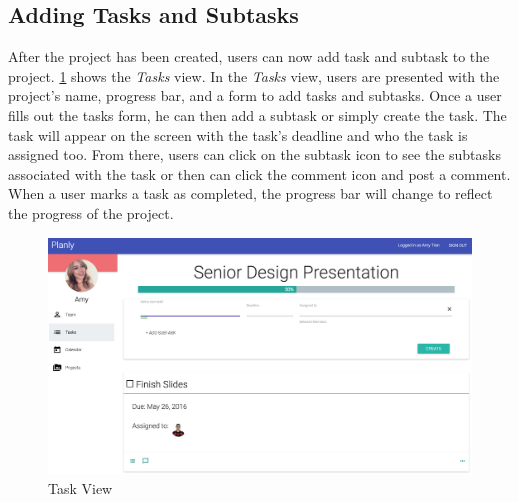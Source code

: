 \subsection{Adding Tasks and Subtasks}
After the project has been created, users can now add task and subtask to the project. \ref{taskview} shows the \emph{Tasks} view. In the \emph{Tasks} view, users are presented with the project's name, progress bar, and a form to add tasks and subtasks. Once a user fills out the tasks form, he can then add a subtask or simply create the task. The task will appear on the screen with the task's deadline and who the task is assigned too. From there, users can click on the subtask icon to see the subtasks associated with the task or then can click the comment icon and post a comment. When a user marks a task as completed, the progress bar will change to reflect the progress of the project. 

\begin{figure}[ht]
\centering
\includegraphics[width=\textwidth]{figure45.png}
\caption{Task View}
\label{taskview}
\end{figure}
\FloatBarrier


